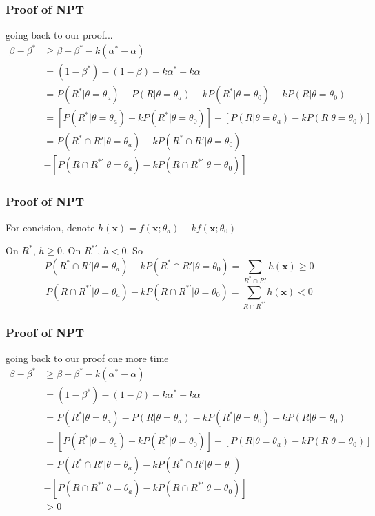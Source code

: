 \documentclass{beamer}
\begin{document}
\begin{frame}
\frametitle{Proof of NPT}

going back to our proof...
\begin{align*}
\beta - \beta^* &\ge \beta - \beta^* - k(\alpha^* - \alpha) \\
&= (1-\beta^*) - (1-\beta) - k\alpha^* + k\alpha \\
&= P(R^*| \theta = \theta_a) - P(R| \theta = \theta_a) - kP(R^* | \theta = \theta_0) + kP(R | \theta = \theta_0) \\
&= \left[ P(R^*| \theta = \theta_a) - kP(R^* | \theta = \theta_0)\right] 
      - \left[P(R| \theta = \theta_a)  - kP(R | \theta = \theta_0) \right] \\
&= P(R^* \cap R'| \theta = \theta_a) - kP(R^* \cap R' | \theta = \theta_0) \\
&- \left[P(R\cap R^{*'}| \theta = \theta_a) - kP(R \cap R^{*'} | \theta = \theta_0)\right] 
\end{align*}




\end{frame}


\begin{frame}
\frametitle{Proof of NPT}

For concision, denote $h(\mathbf{x}) = f(\mathbf{x} ; \theta_a) - k f(\mathbf{x} ; \theta_0)$
\newline

On $R^*$, $h \ge 0$. On $R^{*'}$, $h < 0$. So
\[
P(R^* \cap R'| \theta = \theta_a) - kP(R^* \cap R' | \theta = \theta_0) = \sum_{R^* \cap R'} h(\mathbf{x}) \ge 0
\]
\[
P(R\cap R^{*'}| \theta = \theta_a) - kP(R \cap R^{*'} | \theta = \theta_0) = \sum_{R\cap R^{*'}} h(\mathbf{x}) < 0
\]


\end{frame}

\begin{frame}
\frametitle{Proof of NPT}

going back to our proof one more time
\begin{align*}
\beta - \beta^* &\ge \beta - \beta^* - k(\alpha^* - \alpha) \\
&= (1-\beta^*) - (1-\beta) - k\alpha^* + k\alpha \\
&= P(R^*| \theta = \theta_a) - P(R| \theta = \theta_a) - kP(R^* | \theta = \theta_0) + kP(R | \theta = \theta_0) \\
&= \left[ P(R^*| \theta = \theta_a) - kP(R^* | \theta = \theta_0)\right] 
      - \left[P(R| \theta = \theta_a)  - kP(R | \theta = \theta_0) \right] \\
&= P(R^* \cap R'| \theta = \theta_a) - kP(R^* \cap R' | \theta = \theta_0) \\
&- \left[P(R\cap R^{*'}| \theta = \theta_a) - kP(R \cap R^{*'} | \theta = \theta_0)\right] \\
& > 0
\end{align*}

\end{frame}
\end{document}
